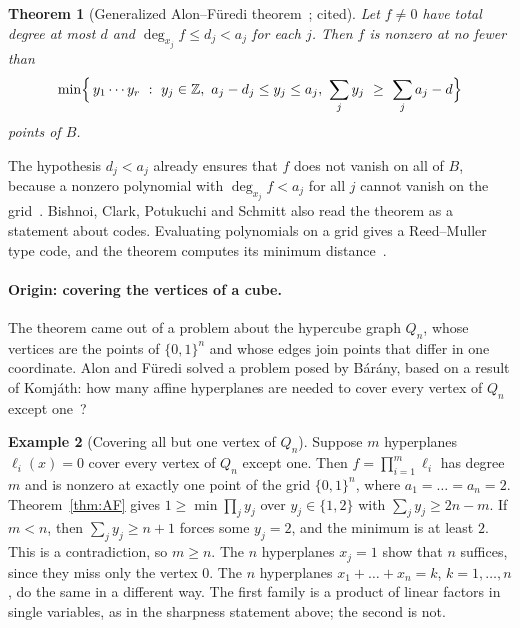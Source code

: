 \documentclass[12pt,letterpaper]{article}
\numberwithin{equation}{section}
\newtheorem{theorem}{Theorem}[section]
\theoremstyle{definition}
\newtheorem{example}[theorem]{Example}
\theoremstyle{remark}
\newcommand{\Z}{\mathbb{Z}}
\begin{document}
\begin{theorem}[Generalized Alon--F\"uredi theorem~\cite{BCPS18};
cited]\label{thm:BCPS}
Let $f\ne0$ have total degree at most $d$ and $\deg_{x_j}f\le d_j<a_j$ for
each $j$. Then $f$ is nonzero at no fewer than
\[
\min\Bigl\{\,y_1\cdots y_r\ :\ y_j\in\Z,\ a_j-d_j\le y_j\le a_j,\
\sum_j y_j\ \ge\ \sum_j a_j-d\Bigr\}
\]
points of $B$.
\end{theorem}

The hypothesis $d_j<a_j$ already ensures that $f$ does not vanish on all of
$B$, because a nonzero polynomial with $\deg_{x_j}f<a_j$ for all $j$ cannot
vanish on the grid~\cite[Lemma~2.1]{Al99}. Bishnoi, Clark, Potukuchi and
Schmitt also read the theorem as a statement about codes. Evaluating
polynomials on a grid gives a Reed--Muller type code, and the theorem
computes its minimum distance~\cite{BCPS18}.

\paragraph{Origin: covering the vertices of a cube.}
The theorem came out of a problem about the hypercube graph $Q_n$, whose
vertices are the points of $\{0,1\}^n$ and whose edges join points that
differ in one coordinate. Alon and F\"uredi solved a problem posed by
B\'ar\'any, based on a result of Komj\'ath: how many affine hyperplanes are
needed to cover every vertex of $Q_n$ except one~\cite{AF93}?

\begin{example}[Covering all but one vertex of $Q_n$]\label{ex:cube}
Suppose $m$ hyperplanes $\ell_i(x)=0$ cover every vertex of $Q_n$ except one.
Then $f=\prod_{i=1}^m\ell_i$ has degree $m$ and is nonzero at exactly one
point of the grid $\{0,1\}^n$, where $a_1=\dots=a_n=2$.
Theorem~\ref{thm:AF} gives $1\ge\min\prod_jy_j$ over $y_j\in\{1,2\}$ with
$\sum_jy_j\ge2n-m$. If $m<n$, then $\sum_jy_j\ge n+1$ forces some $y_j=2$,
and the minimum is at least $2$. This is a contradiction, so $m\ge n$. The
$n$ hyperplanes $x_j=1$ show that $n$ suffices, since they miss only the
vertex $0$. The $n$ hyperplanes $x_1+\dots+x_n=k$, $k=1,\dots,n$, do the same
in a different way. The first family is a product of linear factors in
single variables, as in the sharpness statement above; the second is not.
\end{example}
\end{document}
